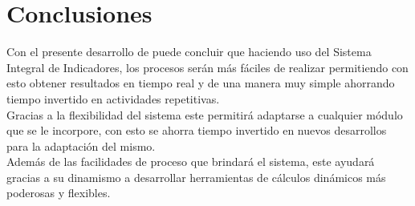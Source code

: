\chapter{Conclusiones}

	Con el presente desarrollo de puede concluir que haciendo uso del Sistema Integral de Indicadores, los procesos ser\'an m\'as f\'aciles de realizar permitiendo con esto obtener resultados en tiempo real y de una manera muy simple ahorrando tiempo invertido en actividades repetitivas.\\

	Gracias a la flexibilidad del sistema este permitir\'a adaptarse a cualquier m\'odulo que se le incorpore, con esto se ahorra tiempo invertido en nuevos desarrollos para la adaptaci\'on del mismo.\\

	Adem\'as de las facilidades de proceso que brindar\'a el sistema, este ayudar\'a gracias a su dinamismo a desarrollar herramientas de c\'alculos din\'amicos m\'as poderosas y flexibles.\\

